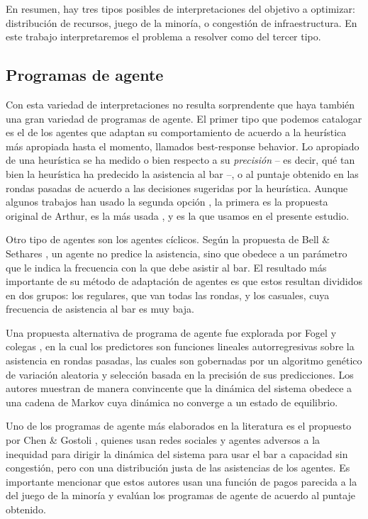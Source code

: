 \documentclass[11pt]{amsart}
\begin{document}
En resumen, hay tres tipos posibles de interpretaciones del objetivo a optimizar: distribución de recursos, juego de la minoría, o congestión de infraestructura. En este trabajo interpretaremos el problema a resolver como del tercer tipo.

\subsection{Programas de agente}
Con esta variedad de interpretaciones no resulta sorprendente que haya también una gran variedad de programas de agente. El primer tipo que podemos catalogar es el de los agentes que adaptan su comportamiento de acuerdo a la heurística más apropiada hasta el momento, llamados best-response behavior. Lo apropiado de una heurística se ha medido o bien respecto a su \emph{precisión} -- es decir, qué tan bien la heurística ha predecido la asistencia al bar --, o al puntaje obtenido en las rondas pasadas de acuerdo a las decisiones sugeridas por la heurística. Aunque algunos trabajos han usado la segunda opción \cite{Challet2004, Chen2017}, la primera es la propuesta original de Arthur, es la más usada \cite{Arthur1994, Johnson1998, Fogel1999, Zambrano2004, Ponsiglione2015}, y es la que usamos en el presente estudio.

Otro tipo de agentes son los agentes cíclicos. Según la propuesta de Bell \& Sethares \cite{Bell2001}, un agente no predice la asistencia, sino que obedece a un parámetro que le indica la frecuencia con la que debe asistir al bar. El resultado más importante de su método de adaptación de agentes es que estos resultan divididos en dos grupos: los regulares, que van todas las rondas, y los casuales, cuya frecuencia de asistencia al bar es muy baja.

Una propuesta alternativa de programa de agente fue explorada por Fogel y colegas \cite{Fogel1999}, en la cual los predictores son funciones lineales autorregresivas sobre la asistencia en rondas pasadas, las cuales son gobernadas por un algoritmo genético de variación aleatoria y selección basada en la precisión de sus predicciones. Los autores muestran de manera convincente que la dinámica del sistema obedece a una cadena de Markov cuya dinámica no converge a un estado de equilibrio.

Uno de los programas de agente más elaborados en la literatura es el propuesto por Chen \& Gostoli \cite{Chen2017}, quienes usan redes sociales y agentes adversos a la inequidad para dirigir la dinámica del sistema para usar el bar a capacidad sin congestión, pero con una distribución justa de las asistencias de los agentes. Es importante mencionar que estos autores usan una función de pagos parecida a la del juego de la minoría y evalúan los programas de agente de acuerdo al puntaje obtenido. 
\end{document}

